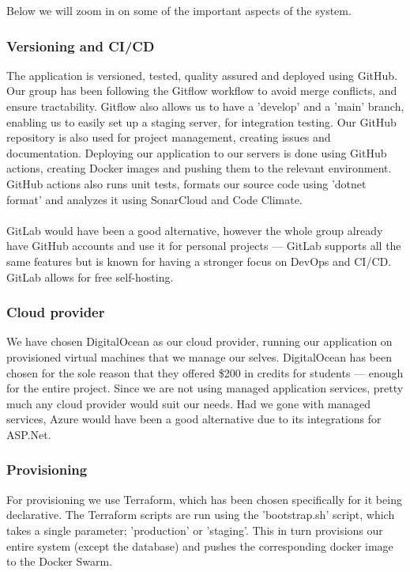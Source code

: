 Below we will zoom in on some of the important aspects of the system. 

\subsubsection{Versioning and CI/CD}
The application is versioned, tested, quality assured and deployed using
GitHub. Our group has been following the Gitflow workflow to avoid merge conflicts, and ensure tractability. Gitflow also allows us to have a 'develop' and a 'main' branch, enabling us to easily set up a staging server, for integration testing.\newline 
Our GitHub repository is also used for project management, creating issues and documentation. Deploying our application to our servers is done using GitHub actions, creating Docker images and pushing them to the relevant environment. GitHub actions also runs unit tests, formats our source code using 'dotnet format' and analyzes it using SonarCloud and Code Climate.\\\\
GitLab would have been a good alternative, however the whole group already have GitHub accounts and use it for personal projects — GitLab supports all the same features but is known for having a stronger focus on DevOps and CI/CD\cite{gitlabvsgithub}. GitLab allows for free self-hosting. 

\subsubsection{Cloud provider}
We have chosen DigitalOcean as our cloud provider, running our application on provisioned virtual machines that we manage our selves. DigitalOcean has been chosen for the sole reason that they offered \$200 in credits for students — enough for the entire project.\newline 
Since we are not using managed application services, pretty much any cloud provider would suit our needs. Had we gone with managed services, Azure would have been a good alternative due to its integrations for ASP.Net.

\subsubsection{Provisioning}
For provisioning we use Terraform, which has been chosen specifically for it being declarative. The Terraform scripts are run using the 'bootstrap.sh' script, which takes a single parameter; 'production' or 'staging'. This in turn provisions our entire system (except the database) and pushes the corresponding docker image to the Docker Swarm.

